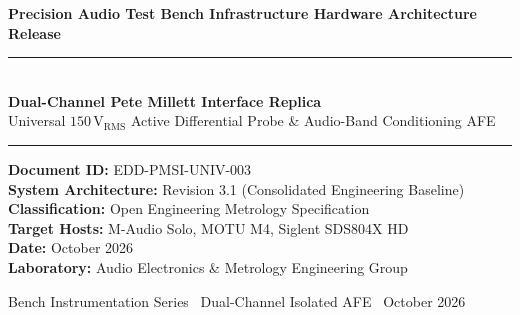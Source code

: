 \documentclass[11pt, letterpaper]{article}
\begin{document}
\begin{titlepage}
    \centering
    \vspace*{2.0cm}

    {\small\bfseries\color{slate} Precision Audio Test Bench Infrastructure \quad\textperiodcentered\quad Hardware Architecture Release}\\[1.0em]
    {\color{accentblue}\rule{\linewidth}{1.4pt}}\\[0.6cm]

    {\huge\bfseries Dual-Channel Pete Millett Interface Replica}\\[0.5cm]
    {\Large\color{slate} Universal $150\,\text{V}_{\text{RMS}}$ Active Differential Probe \& Audio-Band Conditioning AFE}\\[0.8cm]
    {\color{accentblue}\rule{\linewidth}{0.8pt}}

    \vfill

    \begin{minipage}{0.75\linewidth}
        \centering
        \textbf{Document ID:} EDD-PMSI-UNIV-003\\[0.3em]
        \textbf{System Architecture:} Revision 3.1 (Consolidated Engineering Baseline)\\[0.3em]
        \textbf{Classification:} Open Engineering Metrology Specification\\[0.3em]
        \textbf{Target Hosts:} M-Audio Solo, MOTU M4, Siglent SDS804X HD\\[0.3em]
        \textbf{Date:} October 2026\\[0.3em]
        \textbf{Laboratory:} Audio Electronics \& Metrology Engineering Group
    \end{minipage}

    \vfill
    \vspace{1.5cm}

    {\footnotesize\color{slate} Bench Instrumentation Series \textperiodcentered\ Dual-Channel Isolated AFE \textperiodcentered\ October 2026}
\end{titlepage}

\tableofcontents
\newpage

\end{document}
